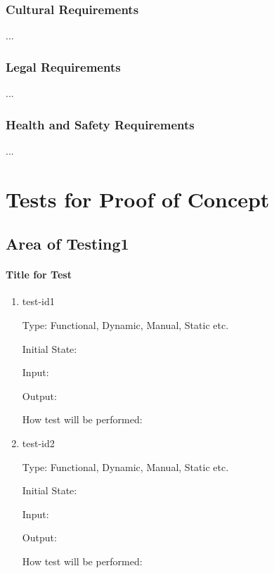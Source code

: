 \documentclass[12pt, titlepage]{article}
\begin{document}
\subsubsection{Cultural Requirements}

...

\subsubsection{Legal Requirements}

...

\subsubsection{Health and Safety Requirements}

...

\section{Tests for Proof of Concept}

\subsection{Area of Testing1}
		
\paragraph{Title for Test}

\begin{enumerate}

\item{test-id1\\}

Type: Functional, Dynamic, Manual, Static etc.
					
Initial State: 
					
Input: 
					
Output: 
					
How test will be performed: 
					
\item{test-id2\\}

Type: Functional, Dynamic, Manual, Static etc.
					
Initial State: 
					
Input: 
					
Output: 
					
How test will be performed: 

\end{enumerate}
\end{document}
